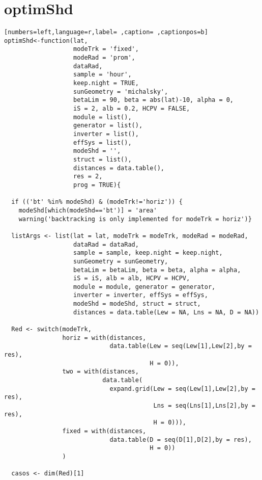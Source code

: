 \section{optimShd}
\label{sec:orgca30e7d}
\begin{lstlisting}[numbers=left,language=r,label= ,caption= ,captionpos=b]
optimShd<-function(lat,
                   modeTrk = 'fixed', 
                   modeRad = 'prom', 
                   dataRad,
                   sample = 'hour',
                   keep.night = TRUE,
                   sunGeometry = 'michalsky',
                   betaLim = 90, beta = abs(lat)-10, alpha = 0,
                   iS = 2, alb = 0.2, HCPV = FALSE,
                   module = list(), 
                   generator = list(),
                   inverter = list(), 
                   effSys = list(), 
                   modeShd = '',    
                   struct = list(), 
                   distances = data.table(),
                   res = 2,      
                   prog = TRUE){ 
  
  if (('bt' %in% modeShd) & (modeTrk!='horiz')) {
    modeShd[which(modeShd=='bt')] = 'area'
    warning('backtracking is only implemented for modeTrk = horiz')}

  listArgs <- list(lat = lat, modeTrk = modeTrk, modeRad = modeRad,
                   dataRad = dataRad,
                   sample = sample, keep.night = keep.night,
                   sunGeometry = sunGeometry,
                   betaLim = betaLim, beta = beta, alpha = alpha,
                   iS = iS, alb = alb, HCPV = HCPV,
                   module = module, generator = generator,
                   inverter = inverter, effSys = effSys,
                   modeShd = modeShd, struct = struct,
                   distances = data.table(Lew = NA, Lns = NA, D = NA))
  
  Red <- switch(modeTrk,
                horiz = with(distances,
                             data.table(Lew = seq(Lew[1],Lew[2],by = res),
                                        H = 0)),
                two = with(distances,
                           data.table(
                             expand.grid(Lew = seq(Lew[1],Lew[2],by = res),
                                         Lns = seq(Lns[1],Lns[2],by = res),
                                         H = 0))),
                fixed = with(distances,
                             data.table(D = seq(D[1],D[2],by = res),
                                        H = 0))
                )
  
  casos <- dim(Red)[1]
  

\end{lstlisting}

